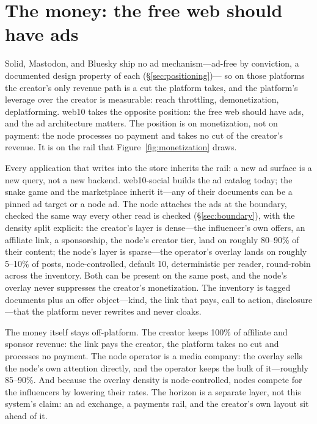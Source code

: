 \documentclass[sigconf, nonacm]{acmart}
\begin{document}
\section{The money: the free web should have ads}
\label{sec:money}

Solid, Mastodon, and Bluesky ship no ad mechanism---ad-free by
conviction, a documented design property of each (\S\ref{sec:positioning})---
so on those platforms the creator's only revenue path is a cut the
platform takes, and the platform's leverage over the creator is
measurable: reach throttling, demonetization, deplatforming. web10 takes
the opposite position: the free web should have ads, and the ad
architecture matters. The position is on monetization, not on payment:
the node processes no payment and takes no cut of the creator's revenue.
It is on the rail that Figure~\ref{fig:monetization} draws.

Every application that writes into the store inherits the rail: a new ad
surface is a new query, not a new backend. web10-social builds the ad
catalog today; the snake game and the marketplace inherit it---any of
their documents can be a pinned ad target or a node ad. The node attaches
the ads at the boundary, checked the same way every other read is
checked (\S\ref{sec:boundary}), with the density split explicit: the
creator's layer is dense---the influencer's own offers, an affiliate
link, a sponsorship, the node's creator tier, land on roughly 80--90\%
of their content; the node's layer is sparse---the operator's overlay
lands on roughly 5--10\% of posts, node-controlled, default 10,
deterministic per reader, round-robin across the inventory. Both can be
present on the same post, and the node's overlay never suppresses the
creator's monetization. The inventory is tagged documents plus an offer
object---kind, the link that pays, call to action, disclosure---that the
platform never rewrites and never cloaks.

The money itself stays off-platform. The creator keeps 100\% of
affiliate and sponsor revenue: the link pays the creator, the platform
takes no cut and processes no payment. The node operator is a media
company: the overlay sells the node's own attention directly, and the
operator keeps the bulk of it---roughly 85--90\%. And because the overlay
density is node-controlled, nodes compete for the influencers by
lowering their rates. The horizon is a separate layer, not this system's
claim: an ad exchange, a payments rail, and the creator's own layout sit
ahead of it.
\end{document}
